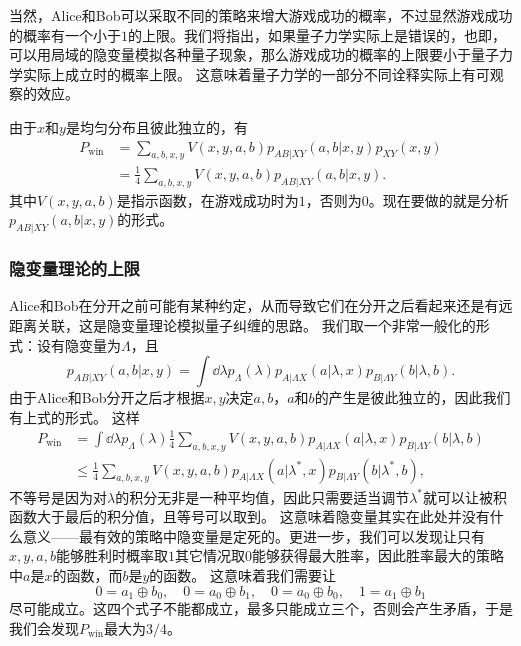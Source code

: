 \documentclass[hyperref, UTF8, a4paper]{ctexart}
\begin{document}
当然，Alice和Bob可以采取不同的策略来增大游戏成功的概率，不过显然游戏成功的概率有一个小于$1$的上限。我们将指出，如果量子力学实际上是错误的，也即，可以用局域的隐变量模拟各种量子现象，那么游戏成功的概率的上限要小于量子力学实际上成立时的概率上限。
这意味着量子力学的一部分不同诠释实际上有可观察的效应。

由于$x$和$y$是均匀分布且彼此独立的，有
\begin{equation}
    \begin{aligned}
        P_\text{win} &= \sum_{a, b, x, y} V(x, y, a, b) p_{AB|XY}(a, b | x, y) p_{XY}(x, y) \\
        &= \frac{1}{4} \sum_{a, b, x, y} V(x, y, a, b) p_{AB|XY}(a, b | x, y).
    \end{aligned}
\end{equation}
其中$V(x, y, a, b)$是指示函数，在游戏成功时为$1$，否则为$0$。现在要做的就是分析$p_{AB|XY}(a, b | x, y)$的形式。

\subsubsection{隐变量理论的上限}

Alice和Bob在分开之前可能有某种约定，从而导致它们在分开之后看起来还是有远距离关联，这是隐变量理论模拟量子纠缠的思路。
我们取一个非常一般化的形式：设有隐变量为$\Lambda$，且
\[
    p_{AB|XY}(a, b | x, y) = \int \dd{\lambda} p_\Lambda(\lambda) p_{A|\Lambda X} (a | \lambda, x) p_{B|\Lambda Y}(b | \lambda, b).
\]
由于Alice和Bob分开之后才根据$x, y$决定$a, b$，$a$和$b$的产生是彼此独立的，因此我们有上式的形式。
这样
\[
    \begin{aligned}
        P_\text{win} &= \int \dd{\lambda} p_\Lambda(\lambda) \frac{1}{4} \sum_{a, b, x, y} V(x, y, a, b) p_{A|\Lambda X} (a | \lambda, x) p_{B|\Lambda Y}(b | \lambda, b) \\
        &\leq \frac{1}{4} \sum_{a, b, x, y} V(x, y, a, b) p_{A|\Lambda X} (a | \lambda^*, x) p_{B|\Lambda Y}(b | \lambda^*, b),
    \end{aligned}
\]
不等号是因为对$\lambda$的积分无非是一种平均值，因此只需要适当调节$\lambda^*$就可以让被积函数大于最后的积分值，且等号可以取到。
这意味着隐变量其实在此处并没有什么意义——最有效的策略中隐变量是定死的。更进一步，我们可以发现让只有$x, y, a, b$能够胜利时概率取$1$其它情况取$0$能够获得最大胜率，因此胜率最大的策略中$a$是$x$的函数，而$b$是$y$的函数。
这意味着我们需要让
\[
    0 = a_1 \oplus b_0, \quad 0 = a_0 \oplus b_1, \quad 0 = a_0 \oplus b_0, \quad 1 = a_1 \oplus b_1
\]
尽可能成立。这四个式子不能都成立，最多只能成立三个，否则会产生矛盾，于是我们会发现$P_\text{win}$最大为$3/4$。
\end{document}
